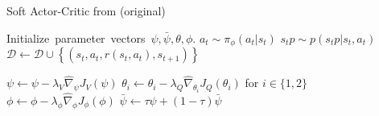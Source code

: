 \begin{algorithm}[H]
\caption{Soft Actor-Critic from \cite{haarnoja2018softactorcriticoffpolicymaximum} (original)}
\label{alg:soft_actor_critic}
\begin{algorithmic}
\STATE \mbox{Initialize parameter vectors $\psi, \bar{\psi}, \theta, \phi$.}
	\STATE $a_t \sim \pi_\phi(a_t|s_t)$
	\STATE $s_tp \sim p(s_tp| s_t, a_t)$
	\STATE $\mathcal{D} \leftarrow \mathcal{D} \cup \left\{(s_t, a_t, r(s_t, a_t), s_{t+1})\right\}$
	\ENDFOR
	\item $\psi \leftarrow \psi - \lambda_V \hat \nabla_\psi J_V(\psi)$
	\STATE $\theta_i \leftarrow \theta_i - \lambda_Q \hat \nabla_{\theta_i} J_Q(\theta_i)$ for $i\in\{1, 2\}$
	\STATE $\phi \leftarrow \phi - \lambda_\phi \hat \nabla_\phi J_\phi(\phi)$
	\STATE $\bar{\psi}\leftarrow \tau \psi + (1-\tau)\bar{\psi}$
	\ENDFOR
\ENDFOR
\end{algorithmic}
\end{algorithm}


